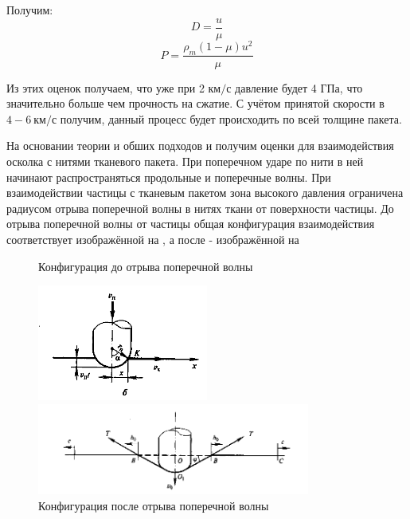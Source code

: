 Получим:
\begin{equation}
    D = \frac{u}{\mu}
\end{equation}
\begin{equation}
    P = \frac{\rho_m (1 - \mu) u ^2}{\mu}
\end{equation}

Из этих оценок получаем, что уже при 2 $км/с$ давление будет 4 ГПа, что значительно больше чем прочность на сжатие.
С учётом принятой скорости в $4-6~км/с$ получим, данный процесс будет происходить по всей толщине пакета.

На основании теории\cite{rakhmatulin} и обших подходов и\cite{kobylkin2014} получим оценки для взаимодействия
осколка с нитями тканевого пакета.
При поперечном ударе по нити в ней начинают распространяться продольные и поперечные волны.
При взаимодействии частицы с тканевым пакетом зона высокого давления ограничена радиусом отрыва поперечной волны
в нитях ткани от поверхности частицы.
До отрыва поперечной волны от частицы общая конфигурация взаимодействия соответствует изображённой на
, а после - изображённой на 

\begin{figure}[H]
    \centering

    \caption{Конфигурация до отрыва поперечной волны}
    \label{fig:first-stage}
    \includegraphics[width=0.5\textwidth]{img/first_stage.png}

    \caption{Конфигурация после отрыва поперечной волны}
    \label{fig:second-stage}
    \includegraphics[width=0.8\textwidth]{img/second_stage.png}
\end{figure}

